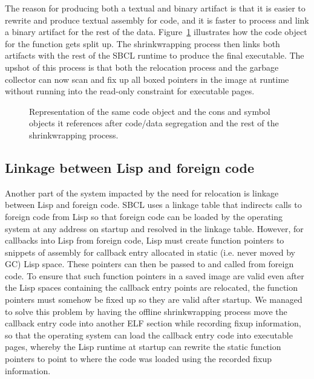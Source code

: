 \documentclass[format=sigconf]{acmart}
\begin{document}
The reason for producing both a textual and binary artifact is that it is easier to rewrite and produce textual assembly for code, and it is faster to process and link a binary artifact for the rest of the data. Figure~\ref{fig:after-shrinkwrap} illustrates how the code object for the function  gets split up. The shrinkwrapping process then links both artifacts with the rest of the SBCL runtime to produce the final executable. The upshot of this process is that both the relocation process and the garbage collector can now scan and fix up all boxed pointers in the image at runtime without running into the read-only constraint for executable pages.

\begin{figure}[h]
  \label{fig:after-shrinkwrap}
  \centering
  
  \caption{Representation of the same code object and the cons and
    symbol objects it references after code/data segregation and the
    rest of the shrinkwrapping process.}
\end{figure}

\subsection{Linkage between Lisp and foreign code}
Another part of the system impacted by the need for relocation is linkage between Lisp and foreign code. SBCL uses a linkage table that indirects calls to foreign code from Lisp so that foreign code can be loaded by the operating system at any address on startup and resolved in the linkage table. However, for callbacks into Lisp from foreign code, Lisp must create function pointers to snippets of assembly for callback entry allocated in static (i.e. never moved by GC) Lisp space. These pointers can then be passed to and called from foreign code. To ensure that such function pointers in a saved image are valid even after the Lisp spaces containing the callback entry points are relocated, the function pointers must somehow be fixed up so they are valid after startup. We managed to solve this problem by having the offline shrinkwrapping process move the callback entry code into another  ELF section while recording fixup information, so that the operating system can load the callback entry code into executable pages, whereby the Lisp runtime at startup can rewrite the static function pointers to point to where the code was loaded using the recorded fixup information.
\end{document}
